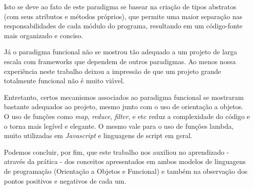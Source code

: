 \documentclass[rel_mlp]{iiufrgs}
\begin{document}
Isto se deve ao fato de este paradigma se basear na criação de tipos abstratos (com seus atributos e métodos próprios), que permite uma maior separação nas responsabilidades de cada módulo do programa, resultando em um código-fonte mais organizado e conciso.

Já o paradigma funcional não se mostrou tão adequado a um projeto de larga escala com frameworks que dependem de outros paradigmas. Ao menos nossa experiência neste trabalho deixou a impressão de que um projeto grande totalmente funcional não é muito viável.

Entretanto, certos mecanismos associados ao paradigma funcional se mostraram bastante adequados ao projeto, mesmo junto com o uso de orientação a objetos. O uso de funções como \textit{map}, \textit{reduce}, \textit{filter}, e etc reduz a complexidade do código e o torna mais legível e elegante. O mesmo vale para o uso de funções lambda, muito utilizadas em \textit{Javascript} e linguagens de script em geral.

Podemos concluir, por fim, que este trabalho nos auxiliou no aprendizado - através da prática - dos conceitos apresentados em ambos modelos de linguagens de programação (Orientação a Objetos e Funcional) e também na observação dos pontos positivos e negativos de cada um.

%

%

\end{document}
